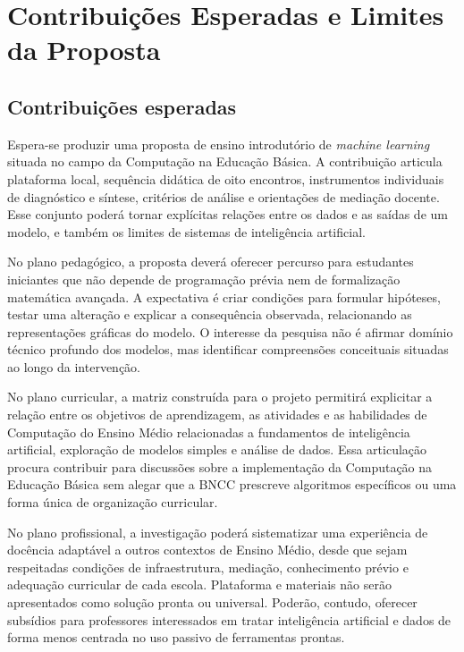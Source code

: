 \chapter{Contribuições Esperadas e Limites da Proposta}

\section{Contribuições esperadas}

Espera-se produzir uma proposta de ensino introdutório de \textit{machine learning} situada no campo da Computação na Educação Básica. A contribuição articula plataforma local, sequência didática de oito encontros, instrumentos individuais de diagnóstico e síntese, critérios de análise e orientações de mediação docente. Esse conjunto poderá tornar explícitas relações entre os dados e as saídas de um modelo, e também os limites de sistemas de inteligência artificial.

No plano pedagógico, a proposta deverá oferecer percurso para estudantes iniciantes que não depende de programação prévia nem de formalização matemática avançada. A expectativa é criar condições para formular hipóteses, testar uma alteração e explicar a consequência observada, relacionando as representações gráficas do modelo. O interesse da pesquisa não é afirmar domínio técnico profundo dos modelos, mas identificar compreensões conceituais situadas ao longo da intervenção.

No plano curricular, a matriz construída para o projeto permitirá explicitar a relação entre os objetivos de aprendizagem, as atividades e as habilidades de Computação do Ensino Médio relacionadas a fundamentos de inteligência artificial, exploração de modelos simples e análise de dados. Essa articulação procura contribuir para discussões sobre a implementação da Computação na Educação Básica sem alegar que a BNCC prescreve algoritmos específicos ou uma forma única de organização curricular.

No plano profissional, a investigação poderá sistematizar uma experiência de docência adaptável a outros contextos de Ensino Médio, desde que sejam respeitadas condições de infraestrutura, mediação, conhecimento prévio e adequação curricular de cada escola. Plataforma e materiais não serão apresentados como solução pronta ou universal. Poderão, contudo, oferecer subsídios para professores interessados em tratar inteligência artificial e dados de forma menos centrada no uso passivo de ferramentas prontas.

